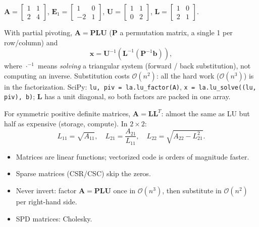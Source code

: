 \documentclass[11pt,a4paper,openany]{book}
\begin{document}
\begin{exbox}[title=$2 \times 2$ example]
$\mathbf{A} = \begin{bmatrix} 1 & 1 \\ 2 & 4 \end{bmatrix}$,
$\mathbf{E}_1 = \begin{bmatrix} 1 & 0 \\ -2 & 1 \end{bmatrix}$,
$\mathbf{U} = \begin{bmatrix} 1 & 1 \\ 0 & 2 \end{bmatrix}$,
$\mathbf{L} = \begin{bmatrix} 1 & 0 \\ 2 & 1 \end{bmatrix}$.
\end{exbox}


\begin{propbox}[title=Using an LU decomposition]
With partial pivoting, $\mathbf{A} = \mathbf{P}\mathbf{L}\mathbf{U}$ ($\mathbf{P}$ a
permutation matrix, a single 1 per row/column) and
\[
\mathbf{x} = \mathbf{U}^{-1}(\mathbf{L}^{-1}(\mathbf{P}^{-1}\mathbf{b})),
\]
where $\cdot^{-1}$ means \emph{solving} a triangular system (forward / back substitution), not
computing an inverse. Substitution costs $\mathcal{O}(n^2)$: all the hard work ($\mathcal{O}(n^3)$)
is in the factorization. SciPy: \texttt{lu, piv = la.lu\_factor(A)}, \texttt{x =
la.lu\_solve((lu, piv), b)}; $\mathbf{L}$ has a unit diagonal, so both factors are packed in
one array.
\end{propbox}


\begin{defnbox}[title=Cholesky decomposition]
For symmetric positive definite matrices, $\mathbf{A} = \mathbf{L}\mathbf{L}^T$: almost the same
as LU but half as expensive (storage, compute). In $2 \times 2$:
\[
L_{11} = \sqrt{A_{11}}, \quad L_{21} = \frac{A_{21}}{L_{11}}, \quad
L_{22} = \sqrt{A_{22} - L_{21}^2}.
\]
\end{defnbox}

\begin{keybox}[title=Summary]
\begin{itemize}
  \item Matrices are linear functions; vectorized code is orders of magnitude faster.
  \item Sparse matrices (CSR/CSC) skip the zeros.
  \item Never invert: factor $\mathbf{A} = \mathbf{P}\mathbf{L}\mathbf{U}$ once in
        $\mathcal{O}(n^3)$, then substitute in $\mathcal{O}(n^2)$ per right-hand side.
  \item SPD matrices: Cholesky.
\end{itemize}
\end{keybox}
\end{document}
